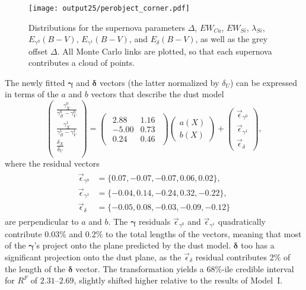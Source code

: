 \documentclass{aastex61}   	%
\begin{document}
\begin{figure}[htbp] %
   \centering
   \texttt{[image: output25/perobject\_corner.pdf]} 
   \caption{
   Distributions for the supernova parameters $\Delta$, $EW_{Ca}$, $EW_{Si}$, $\lambda_{Si}$, $E_{\gamma^0}(B-V)$,  $E_{\gamma^1}(B-V)$,  and $E_{\delta}(B-V)$, as well as the grey offset
$\Delta$.  All Monte Carlo links are plotted, so that each supernova contributes a cloud of points.
   \label{perobject2:fig}}
\end{figure}


\color{red}
The newly fitted $\pmb{\gamma}$ and  $\pmb{\delta}$ vectors (the latter normalized by $\delta_U$) can be expressed 
in terms of the $a$ and $b$ vectors that describe the  dust model
\color{black}
\begin{equation}
\begin{pmatrix}
 \frac{\gamma^0_X}{\gamma^0_B-\gamma^0_V} \\
\frac{\gamma^1_X}{\gamma^1_B-\gamma^1_V} \\
\frac{\delta_X}{\delta_U} \\
\end{pmatrix}=
\begin{pmatrix}
\begin{array}{rr}
2.88 & 1.16 \\
-5.00 & 0.73 \\
0.24 & 0.46
\end{array}
\end{pmatrix} 
\begin{pmatrix}
a(X) \\
b(X)
\end{pmatrix}+
\begin{pmatrix}
\vec{\epsilon}_{\gamma^0} \\
\vec{\epsilon}_{\gamma^1} \\
\vec{\epsilon}_{\delta}
\end{pmatrix},
\label{model2trans:eqn}
\end{equation}
where the residual vectors
\begin{align}
\begin{split}
\vec{\epsilon}_{\gamma^0} &=\{0.07, -0.07, -0.07,  0.06,  0.02\},\\
\vec{\epsilon}_{\gamma^1} &=\{ -0.04, 0.14,  -0.24,  0.32, -0.22\},\\
\vec{\epsilon}_{\delta} &=\{ -0.05, 0.08,  -0.03,  -0.09, -0.12\}
\end{split}
\label{model2res:eqn}
\end{align}
are perpendicular to $a$ and $b$.
The $\pmb{\gamma}$ residuals $\vec{\epsilon}_{\gamma^0}$ and
$\vec{\epsilon}_{\gamma^1} $
quadratically contribute 0.03\% and 0.2\% to the total  lengths of the vectors, meaning that most
of the $\pmb{\gamma}$'s project onto the plane predicted by the  dust model.
\color{red}
 $\pmb{\delta}$ too
has a significant projection onto the dust plane, as the $\vec{\epsilon}_{\delta}$ residual contributes 2\% of the length of the $\pmb{\delta}$ vector.
The transformation yields
a 68\%-ile  credible interval for $R^F$ of  $2.31$--$2.69$, slightly shifted higher relative to the results of Model~I.
\color{black}
\end{document}
